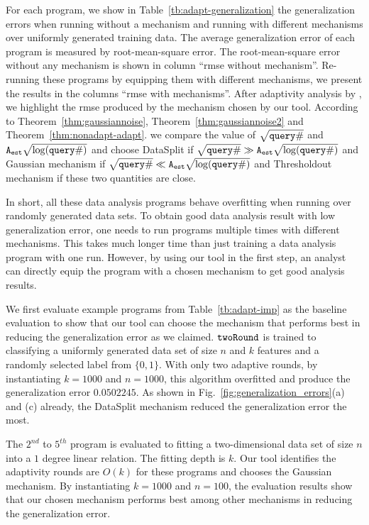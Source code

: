 For each program, we show in Table~\ref{tb:adapt-generalization} the generalization errors when running without a mechanism
and running with different mechanisms over uniformly generated training data.
The average generalization error of each program is measured by root-mean-square error.
The root-mean-square error without any mechanism is shown in column ``rmse without mechanism''.
Re-running these programs by equipping them with different mechanisms, we present the results
in the columns ``rmse with mechanisms''.
After adaptivity analysis by {\THESYSTEM}, we highlight the rmse produced by the mechanism chosen by our tool.
According to Theorem~\ref{thm:gaussiannoise}, Theorem~\ref{thm:gaussiannoise2} and Theorem~\ref{thm:nonadapt-adapt}.
we compare the value of $\sqrt{{\tt query} \#}$ and ${\mathtt{A_{est}}}\sqrt{\log({\tt query} \#)}$
and choose DataSplit if $\sqrt{{\tt query} \#} \gg {\ensuremath{\mathtt{A_{est}}}}\sqrt{\log({\tt query} \#)}$ and Gaussian mechanism if
$\sqrt{{\tt query} \#} \ll {\ensuremath{\mathtt{A_{est}}}}\sqrt{\log({\tt query} \#)}$ and Thresholdout mechanism if these two quantities are close.

In short, all these data analysis programs behave overfitting when running over randomly generated data sets. 
To obtain good data analysis result with low generalization error,
one needs to run programs multiple times with different mechanisms.
This takes much longer time than just training a data analysis program with one run.
However, by using our tool in the first step, an analyst can directly equip the program with a chosen mechanism to get good
analysis results.


We first evaluate example programs from Table~\ref{tb:adapt-imp} as the baseline evaluation to show that our tool can choose the mechanism that performs best in reducing the generalization error as we claimed.
$\mathtt{twoRound}$ is trained to classifying a uniformly generated data set of size $n$ and $k$ features and a randomly selected label from $\{0, 1\}$. 
With only two adaptive rounds, by instantiating $k = 1000$ and $n = 1000$, this algorithm overfitted and produce the generalization error 
$0.0502245$. 
As shown in Fig.~\ref{fig:generalization_errors}(a) and (c) already,
the DataSplit mechanism reduced the generalization error the most.

The $2^{nd}$ to $5^{th}$ program is evaluated to fitting a two-dimensional data set of size $n$ into a $1$ degree linear relation.
The fitting depth is $k$.
Our tool identifies the adaptivity rounds are $O(k)$ for these programs and chooses the Gaussian mechanism.
By instantiating $k = 1000$ and $n = 100$, the evaluation results show that our chosen mechanism performs best among other mechanisms in reducing the generalization error.

